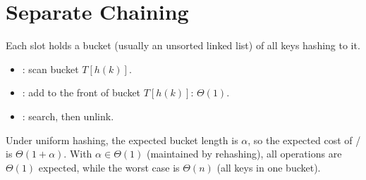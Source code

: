 \section{Separate Chaining}

Each slot holds a bucket (usually an unsorted linked list) of all keys hashing to it.
\begin{itemize}
  \item {}: scan bucket $T[h(k)]$.
  \item {}: add to the front of bucket $T[h(k)]$: $\Theta(1)$.
  \item {}: search, then unlink.
\end{itemize}
Under uniform hashing, the expected bucket length is $\alpha$, so the expected
cost of / is $\Theta(1 + \alpha)$. With $\alpha \in
\Theta(1)$ (maintained by rehashing), all operations are $\Theta(1)$ expected,
while the worst case is $\Theta(n)$ (all keys in one bucket).

